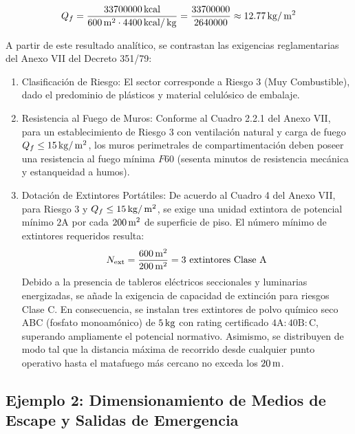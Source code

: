 \begin{equation}
Q_f = \frac{33700000\,\mathrm{kcal}}{600\,\mathrm{m}^2 \cdot 4400\,\mathrm{kcal}/\,\mathrm{kg}} = \frac{33700000}{2640000} \approx 12.77\,\mathrm{kg}/\,\mathrm{m}^2
\end{equation}

A partir de este resultado analítico, se contrastan las exigencias reglamentarias del Anexo VII del Decreto 351/79:

\begin{enumerate}
    \item Clasificación de Riesgo: El sector corresponde a Riesgo 3 (Muy Combustible), dado el predominio de plásticos
          y material celulósico de embalaje.
    \item Resistencia al Fuego de Muros: Conforme al Cuadro 2.2.1 del Anexo VII, para un establecimiento de Riesgo 3 con
          ventilación natural y carga de fuego $Q_f \le 15\,\mathrm{kg}/\,\mathrm{m}^2$, los muros perimetrales de compartimentación deben
          poseer una resistencia al fuego mínima $F60$ (sesenta minutos de resistencia mecánica y estanqueidad a humos).
    \item Dotación de Extintores Portátiles: De acuerdo al Cuadro 4 del Anexo VII, para Riesgo 3 y $Q_f \le 15\,\mathrm{kg}/\,\mathrm{m}^2$,
          se exige una unidad extintora de potencial mínimo $2\mathrm{A}$ por cada $200\,\mathrm{m}^2$ de superficie de piso. El número
          mínimo de extintores requeridos resulta:
          \begin{equation}
          N_{\text{ext}} = \frac{600\,\mathrm{m}^2}{200\,\mathrm{m}^2} = 3 \text{ extintores Clase A}
          \end{equation}
          Debido a la presencia de tableros eléctricos seccionales y luminarias energizadas, se añade la exigencia de
          capacidad de extinción para riesgos Clase C. En consecuencia, se instalan tres extintores de polvo químico seco
          ABC (fosfato monoamónico) de $5\,\mathrm{kg}$ con rating certificado $4\mathrm{A}:40\mathrm{B:C}$, superando ampliamente el
          potencial normativo. Asimismo, se distribuyen de modo tal que la distancia máxima de recorrido desde cualquier
          punto operativo hasta el matafuego más cercano no exceda los $20\,\mathrm{m}$.
\end{enumerate}

\subsection{Ejemplo 2: Dimensionamiento de Medios de Escape y Salidas de Emergencia}
\label{sec.cap4:ejemplo_uas}


